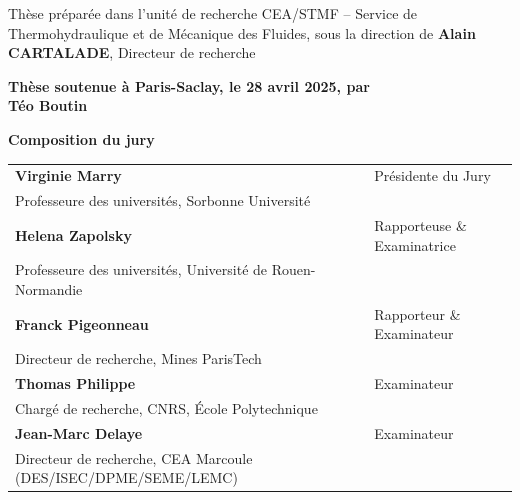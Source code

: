 {{\begin{titlepage}
        \footnotesize Thèse préparée dans l'unité de recherche CEA/STMF -- Service de Thermohydraulique et de Mécanique des Fluides, sous la direction de \textbf{Alain CARTALADE}, Directeur de recherche\\
        \vspace{15mm}
        
        \textbf{Thèse soutenue à Paris-Saclay, le 28 avril 2025, par}\\
        \bigskip
        \LARGE {\color{Prune} \textbf{Téo Boutin}} %
        
        \vspace{\fill} %
        
        \bigskip
        
        \flushleft
        \small \textbf{Composition du jury}\\
        \vspace{2mm}
        \scriptsize
        \begin{tabular}{|>{\raggedright\arraybackslash}p{9cm}l}
            \arrayrulecolor{Prune}
            \textbf{Virginie Marry}											& Présidente du Jury\\ 
            Professeure des universités, Sorbonne Université				& \\ 
            \textbf{Helena Zapolsky}										& Rapporteuse \& Examinatrice \\ 
            Professeure des universités, Université de Rouen-Normandie		& \\ 
            \textbf{Franck Pigeonneau}										& Rapporteur \& Examinateur \\ 
            Directeur de recherche, Mines ParisTech							& \\ 
            \textbf{Thomas Philippe} 										& Examinateur\\ 
            Chargé de recherche, CNRS, \'Ecole Polytechnique				& \\ 
            \textbf{Jean-Marc Delaye} 										& Examinateur\\ 
            Directeur de recherche, CEA Marcoule (DES/ISEC/DPME/SEME/LEMC)	&
            

\end{tabular}
\end{titlepage}}}
